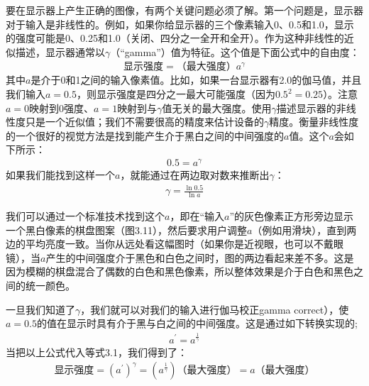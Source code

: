 \documentclass[lang=cn,12pt,marginpar=margintrue]{elegantbook}
\begin{document}
要在显示器上产生正确的图像，有两个关键问题必须了解。第一个问题是，显示器对于输入是非线性的。例如，如果你给显示器的三个像素输入0、0.5和1.0，显示的强度可能是0、0.25和1.0（关闭、四分之一全开和全开）。作为这种非线性的近似描述，显示器通常以$\gamma $（“gamma”）值为特征。这个值是下面公式中的自由度：
\begin{align}
  \text{显示强度}=\text{（最大强度）}a^\gamma
\end{align}
其中$a$是介于0和1之间的输入像素值。比如，如果一台显示器有2.0的伽马值，并且我们输入$a=0.5$，则显示强度是四分之一最大可能强度（因为$0.5^2=0.25$）。注意$a=0$映射到0强度、$a=1$映射到与$\gamma$值无关的最大强度。使用$\gamma$描述显示器的非线性度只是一个近似值；我们不需要很高的精度来估计设备的$\gamma$精度。衡量非线性度的一个很好的视觉方法是找到能产生介于黑白之间的中间强度的$a$值。这个$a$会如下所示：
\[
  \begin{aligned}
    0.5 = a^\gamma
  \end{aligned}
\]
如果我们能找到这样一个$a$，就能通过在两边取对数来推断出$\gamma$：
\[
  \begin{aligned}
    \gamma = \frac{\ln 0.5}{\ln a}
  \end{aligned}
\]

我们可以通过一个标准技术找到这个$a$，即在“输入$a$”的灰色像素正方形旁边显示一个黑白像素的棋盘图案（图3.11），然后要求用户调整$a$（例如用滑块），直到两边的平均亮度一致。当你从远处看这幅图时（如果你是近视眼，也可以不戴眼镜），当$a$产生的中间强度介于黑色和白色之间时，图的两边看起来差不多。这是因为模糊的棋盘混合了偶数的白色和黑色像素，所以整体效果是介于白色和黑色之间的统一颜色。


一旦我们知道了$\gamma$，我们就可以对我们的输入进行伽马校正gamma correct），使$a=0.5$的值在显示时具有介于黑与白之间的中间强度。这是通过如下转换实现的;
\[
  \begin{aligned}
    a^{'} = a^{\frac{1}{\gamma } }
  \end{aligned}
\]
当把以上公式代入等式3.1，我们得到了：
\[
  \begin{aligned}
    \text{显示强度} = (a^{'})^\gamma = (a^{\frac{1}{\gamma}})\text{（最大强度）} = a\text{（最大强度）}
  \end{aligned}
\]
\end{document}
